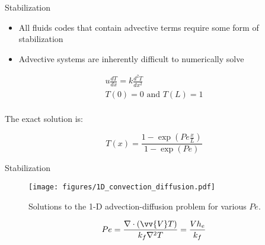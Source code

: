 \documentclass{beamer}
\begin{document}
\begin{frame}{Stabilization}

\begin{itemize}
\item All fluids codes that contain advective terms require some form of stabilization
\item Advective systems are inherently difficult to numerically solve
\end{itemize}

\begin{equation}
\begin{aligned}
u \frac{dT}{dx}=k\frac{d^2T}{dx^2}\\
T(0)=0 \textrm{\ and\ } T(L)=1\\
\end{aligned}
\end{equation}

The exact solution is:

\begin{equation}
T(x)=\frac{1-\exp\left(Pe \frac{x}{L}\right)}{1-\exp(Pe)}
\end{equation}

\end{frame}


\begin{frame}{Stabilization}

\begin{figure}[H]
  \centering
  \texttt{[image: figures/1D\_convection\_diffusion.pdf]}
  \caption{Solutions to the 1-D advection-diffusion problem for various \(Pe\).}
\end{figure}

\begin{equation}
Pe=\frac{\nabla\cdot(\vv{V}T)}{k_f\nabla^2 T}= \frac{Vh_e}{k_f}
\end{equation}

\end{frame}

\end{document}
